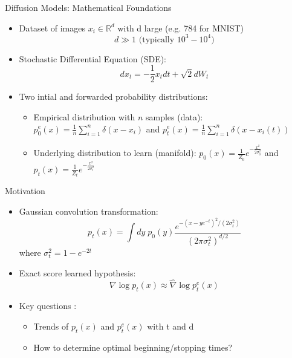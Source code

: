 \documentclass[aspectratio=169]{beamer}
\begin{document}
\begin{frame}{Diffusion Models: Mathematical Foundations}
    \begin{itemize}
        \item Dataset of images $x_i \in \mathbb{R}^d$ with d large (e.g. 784 for MNIST)
         \begin{equation}
            d \gg 1 \text{ (typically } 10^3-10^4\text{)}
        \end{equation}
        \item Stochastic Differential Equation (SDE):
        \begin{equation}
            dx_t = -\frac{1}{2} x_t dt + \sqrt{2} dW_t
        \end{equation}
        
        
        \item Two intial and forwarded probability distributions:
        \begin{itemize}
            \item Empirical distribution with $n$ samples (data): $p_0^e(x) = \frac{1}{n} \sum_{i=1}^n \delta(x-x_i)$ and $p_t^e(x) = \frac{1}{n} \sum_{i=1}^n \delta(x-x_i(t))$
            \item Underlying distribution to learn (manifold): $p_0(x) = \frac{1}{Z_0} e^{-\frac{x^2}{2\sigma_0^2}}$ and $p_t(x) = \frac{1}{Z_t} e^{-\frac{x^2}{2\sigma_t^2}}$
        \end{itemize}
        
    \end{itemize}
\end{frame}

\begin{frame}{Motivation}
    \begin{itemize}
        
        \item Gaussian convolution transformation:
        \begin{equation}
            p_t(x) = \int dy \; p_0(y) \frac{e^{-(x-ye^{-t})^2/(2\sigma_t^2)}}{(2\pi\sigma_t^2)^{d/2}}
        \end{equation}
        where $\sigma_t^2 = 1-e^{-2t}$

        \item Exact score learned hypothesis:
        \begin{equation}
            \nabla \log p_t(x) \approx \hat{\nabla} \log p_t^e(x)
        \end{equation}

        \item Key questions :
        \begin{itemize}
            \item Trends of $p_t(x)$ and $p_t^e(x)$ with t and d
            \item How to determine optimal beginning/stopping times?
        \end{itemize}
    \end{itemize}
\end{frame}
\end{document}
